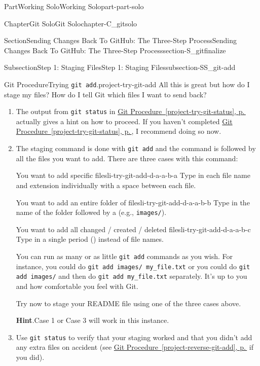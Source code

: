 \documentclass[twoside,10pt,]{book}
\newcommand{\blocktitlefont}{\relax}
\newcommand{\xreffont}{\relax}
\newcommand{\mono}[1]{\texttt{#1}}
\newcommand{\kbd}[1]{\keys{{#1}}}
\begin{document}
\begin{partptx}{Part}{Working Solo}{}{Working Solo}{}{}{part-part-solo}
\begin{chapterptx}{Chapter}{Git Solo}{}{Git Solo}{}{}{chapter-C_gitsolo}
\begin{sectionptx}{Section}{Sending Changes Back To GitHub: The Three-Step Process}{}{Sending Changes Back To GitHub: The Three-Step Process}{}{}{section-S_gitfinalize}
\begin{subsectionptx}{Subsection}{Step 1: Staging Files}{}{Step 1: Staging Files}{}{}{subsection-SS_git-add}
\begin{project}{Git Procedure}{Trying \mono{git add}.}{project-try-git-add}%
All this is great but how do I stage my files? How do I tell Git which files I want to send back?%
\begin{enumerate}[font=\bfseries,label=(\alph*),ref=\alph*]%
\item{}The output from \mono{git status} in \hyperref[project-try-git-status]{Git Procedure~{\xreffont\ref{project-try-git-status}}, p.\,\pageref{project-try-git-status}} actually gives a hint on how to proceed. If you haven't completed \hyperref[project-try-git-status]{Git Procedure~{\xreffont\ref{project-try-git-status}}, p.\,\pageref{project-try-git-status}}, I recommend doing so now.%
\item{}The staging command is done with \mono{git add} and the command is followed by all the files you want to add. There are three cases with this command:%
\begin{descriptionlist}
\begin{dlimedium}{You want to add specific files}{li-try-git-add-d-a-a-b-a}%
Type in each file name and extension individually with a space between each file.%
\end{dlimedium}%
\begin{dlimedium}{You want to add an entire folder of files}{li-try-git-add-d-a-a-b-b}%
Type in the name of the folder followed by a \kbd{/} (e.g.\@, \mono{images/}).%
\end{dlimedium}%
\begin{dlimedium}{You want to add all changed \slash{} created \slash{} deleted files}{li-try-git-add-d-a-a-b-c}%
Type in a single period (\kbd{.}) instead of file names.%
\end{dlimedium}%
\end{descriptionlist}
%
\par
You can run as many or as little \mono{git add} commands as you wish. For instance, you could do \mono{git add images/ my\_file.txt} or you could do \mono{git add images/} and then do \mono{git add my\_file.txt} separately. It's up to you and how comfortable you feel with Git.%
\par
Try now to stage your README file using one of the three cases above.%
\par\smallskip%
\noindent\textbf{\blocktitlefont Hint}.\label{hint-try-git-add-d-b}{}\hypertarget{hint-try-git-add-d-b}{}\quad{}Case 1 or Case 3 will work in this instance.%
\item{}Use \mono{git status} to verify that your staging worked and that you didn't add any extra files on accident (see \hyperref[project-reverse-git-add]{Git Procedure~{\xreffont\ref{project-reverse-git-add}}, p.\,\pageref{project-reverse-git-add}} if you did).%

\end{enumerate}
\end{project}
\end{subsectionptx}
\end{sectionptx}
\end{chapterptx}
\end{partptx}
\end{document}
